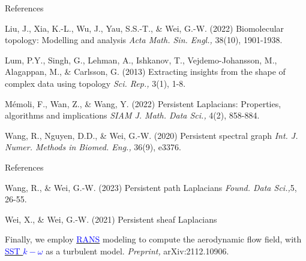 \documentclass[aspectratio=169,xcolor=dvipsnames]{beamer}
\begin{document}
\begin{frame}{References}
    \footnotesize{
        \begin{thebibliography}{99}
             Liu, J., Xia, K.-L., Wu, J., Yau, S.S.-T., \& Wei, G.-W. (2022)
            \newblock Biomolecular topology: Modelling and analysis
            \newblock \emph{Acta Math. Sin. Engl.,} 38(10), 1901-1938.
        \end{thebibliography}
        \begin{thebibliography}{99}
             Lum, P.Y., Singh, G., Lehman, A., Ishkanov, T., Vejdemo-Johansson, M., Alagappan, M., \& Carlsson, G. (2013)
            \newblock Extracting insights from the shape of complex data using topology
            \newblock \emph{ Sci. Rep.,} 3(1), 1-8.
        \end{thebibliography}
        \begin{thebibliography}{99}
             Mémoli, F., Wan, Z., \& Wang, Y. (2022)
            \newblock Persistent Laplacians: Properties, algorithms and implications
            \newblock \emph{SIAM J. Math. Data Sci.,} 4(2), 858-884.
        \end{thebibliography}
        \begin{thebibliography}{99}
             Wang, R., Nguyen, D.D., \& Wei, G.-W. (2020)
            \newblock Persistent spectral graph
            \newblock \emph{Int. J. Numer. Methods in Biomed. Eng.,} 36(9), e3376.
        \end{thebibliography}
    }
\end{frame}

\begin{frame}{References}
    \footnotesize{
        \begin{thebibliography}{99}
               Wang, R., \& Wei, G.-W. (2023)
            \newblock Persistent path Laplacians
            \newblock \emph{Found. Data Sci.,}5, 26-55.
        \end{thebibliography}
        \begin{thebibliography}{99}
             Wei, X., \& Wei, G.-W. (2021)
            \newblock Persistent sheaf Laplacians
       \item Finally, we employ  \href{https://resources.system-analysis.cadence.com/blog/msa2021-the-reynolds-averaged-navier-stokes-rans-equations-and-models}{\textcolor{blue}{RANS}} modeling to compute the aerodynamic flow field, with \href{https://turbmodels.larc.nasa.gov/sst.html}{\textcolor{blue}{SST $k-\omega$}} as a turbulent model. 
            \newblock \emph{Preprint,} arXiv:2112.10906.
        \end{thebibliography}
}
\end{frame}
\end{document}

